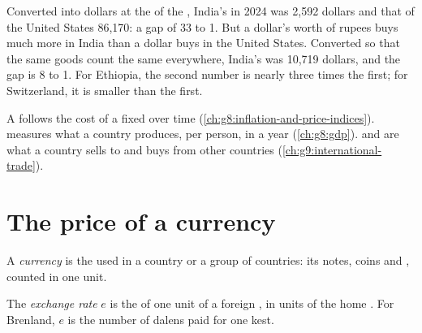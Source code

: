 Converted into dollars at the  of the , India's  in 2024 was 2,592
dollars and that of the United States 86,170: a gap of 33 to 1. But a dollar's worth of rupees buys
much more in India than a dollar buys in the United States. Converted so that the same goods count the
same everywhere, India's  was 10,719 dollars, and the gap is 8 to 1. For Ethiopia, the
second number is nearly three times the first; for Switzerland, it is smaller than the first.

\begin{recall}
A  follows the cost of a fixed  over time (\cref{ch:g8:inflation-and-price-indices}).  measures what a country produces, per person, in a year (\cref{ch:g8:gdp}).  and 
are what a country sells to and buys from other countries (\cref{ch:g9:international-trade}).
\end{recall}

\section{The price of a currency}

\begin{definition}[Currency]\label{def:g9:exchange-rates-and-purchasing-power:currency}
A \emph{currency} is the  used in a country or a group of countries: its notes,
coins and  , counted in one unit.
\end{definition}

\begin{definition}\label{def:g9:exchange-rates-and-purchasing-power:exchange-rate}
The \emph{exchange rate} $e$ is the  of one unit of a foreign , in
units of the home . For Brenland, $e$ is the number of dalens paid for one kest.
\end{definition}

